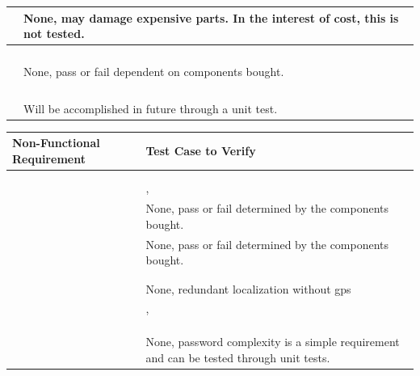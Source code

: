 \documentclass[12pt, titlepage]{article}
\begin{document}
\begin{table}[!h]
\begin{center}
\begin{tabular}{ | m{3cm} | m{12cm} | }
\nameref{MTNC_003} & None, may damage expensive parts. In the interest of cost, this is not tested. \\ \hline
\nameref{SAFE_001} & \nameref{tab:STC_021} \\ \hline
\nameref{SAFE_002} & \nameref{tab:STC_002} \\ \hline
\nameref{SAFE_003} & \nameref{tab:STC_018} \\ \hline
\nameref{SAFE_004} & \nameref{tab:STC_021} \\ \hline
\nameref{SAFE_005} & None, pass or fail dependent on components bought. \\ \hline
\nameref{USE_001} & \nameref{tab:STC_004} \\ \hline
\nameref{USE_002} & \nameref{tab:STC_022} \\ \hline
\nameref{USE_003} & \nameref{tab:STC_006} \\ \hline
\nameref{USE_004} & \nameref{tab:STC_017} \\ \hline
\nameref{USE_005} & Will be accomplished in future through a unit test. \\ \hline
\end{tabular}
\end{center}
\end{table}


\begin{table}[!h]
\begin{center}
\begin{tabular}{ | m{8cm} | m{8cm} | } 
\hline
Non-Functional Requirement & Test Case to Verify \\
\hline
\nameref{SR_001} & \nameref{tab:STC_023} \\ \hline
\nameref{SR_002} & \nameref{tab:STC_018} \\ \hline
\nameref{SR_003} & \nameref{tab:STC_005}, \nameref{tab:STC_006} \\ \hline
\nameref{SR_004} & None, pass or fail determined by the components bought. \\ \hline
\nameref{SR_005} & None, pass or fail determined by the components bought. \\ \hline
\nameref{SR_006} & \nameref{tab:STC_018} \\ \hline
\nameref{SR_007} & \nameref{tab:STC_010} \\ \hline
\nameref{SR_008} & None, redundant localization without gps \\ \hline
\nameref{SR_009} & \nameref{tab:STC_015}, \nameref{tab:STC_014} \\ \hline
\nameref{SR_010} & \nameref{tab:STC_018} \\ \hline
\nameref{SR_011} & \nameref{tab:STC_006} \\ \hline
\nameref{SR_012} & \nameref{tab:STC_007} \\ \hline
\nameref{SR_013} & None, password complexity is a simple requirement and can be tested through unit tests. \\ \hline
\end{tabular}
\end{center}
\end{table}
\end{document}
